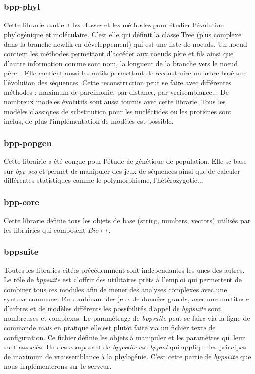 	\subsubsection*{bpp-phyl}
	Cette librarie contient les classes et les méthodes pour étudier l'évolution phylogénique et moléculaire. C'est elle qui définit la classe Tree (plus complexe dans la branche newlik en développement) qui est une liste de noeuds. Un noeud contient les méthodes permettant d'accéder aux noeuds père et fils ainsi que d'autre information comme sont nom, la longueur de la branche vers le noeud père...
	Elle contient aussi les outils permettant de reconstruire un arbre basé sur l'évolution des séquences. Cette reconstruction peut se faire avec différentes méthodes : maximum de parcimonie, par distance, par vraisemblance...
	De nombreux modèles évolutifs sont aussi fournis avec cette librarie. Tous les modèles classiques de substitution pour les nucléotides ou les protéines sont inclus, de plus l'implémentation de modèles est possible.
	\subsubsection*{bpp-popgen}
	Cette librairie a été conçue pour l'étude de génétique de population. Elle se base sur \textit{bpp-seq} et permet de manipuler des jeux de séquences ainsi que de calculer différentes statistiques comme le polymorphisme, l'hétérozygotie...
	
	\subsubsection*{bpp-core}
	Cette librarie définie tous les objets de base (string, numbers, vectors) utilisés par les librairies qui composent \textit{Bio++}.
	
	\subsubsection*{bppsuite}
	Toutes les libraries citées précédemment sont indépendantes les unes des autres. Le rôle de \textit{bppsuite} est d'offrir des utilitaires prêts à l'emploi qui permettent de combiner tous ces modules afin de mener des analyses complexes avec une syntaxe commune. En combinant des jeux de données grands, avec une multitude d'arbres et de modèles différents les possibilités d'appel de \textit{bppsuite} sont nombreuses et complexes. Le paramétrage de \textit{bppsuite} peut se faire via la ligne de commande mais en pratique elle est plutôt faite via un fichier texte de configuration. Ce fichier définie les objets à manipuler et les paramètres qui leur sont associés.
	Un des composant de \textit{bppsuite} est \textit{bppml} qui applique les principes de maximum de vraissemblance à la phylogénie. C'est cette partie de \textit{bppsuite} que nous implémenterons sur le serveur.
	
